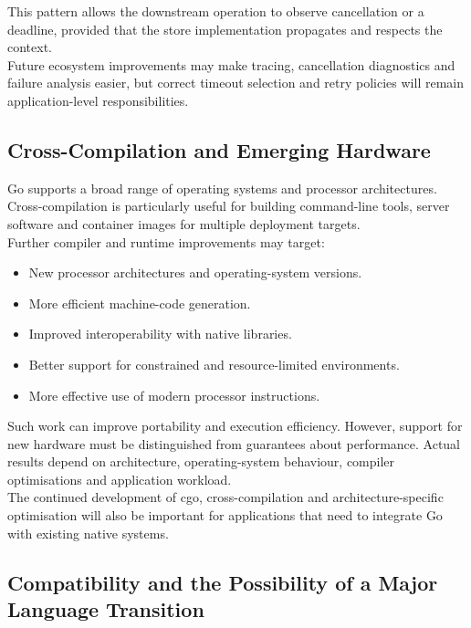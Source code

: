 This pattern allows the downstream operation to observe cancellation or a deadline, provided that the store implementation propagates and respects the context.\\

Future ecosystem improvements may make tracing, cancellation diagnostics and failure analysis easier, but correct timeout selection and retry policies will remain application-level responsibilities.

\subsection{Cross-Compilation and Emerging Hardware}

Go supports a broad range of operating systems and processor architectures. Cross-compilation is particularly useful for building command-line tools, server software and container images for multiple deployment targets.\\

Further compiler and runtime improvements may target:

\begin{itemize}
    \item New processor architectures and operating-system versions.
    \item More efficient machine-code generation.
    \item Improved interoperability with native libraries.
    \item Better support for constrained and resource-limited environments.
    \item More effective use of modern processor instructions.
\end{itemize}

Such work can improve portability and execution efficiency. However, support for new hardware must be distinguished from guarantees about performance. Actual results depend on architecture, operating-system behaviour, compiler optimisations and application workload.\\

The continued development of cgo, cross-compilation and architecture-specific optimisation will also be important for applications that need to integrate Go with existing native systems.

\subsection{Compatibility and the Possibility of a Major Language Transition}


